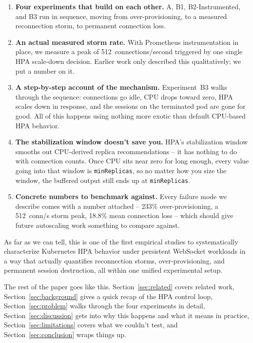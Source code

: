 \documentclass[twocolumn]{svjour3}
\begin{document}
\begin{enumerate}[leftmargin=*]
\item \textbf{Four experiments that build on each other.} A, B1, B2-Instrumented,
  and B3 run in sequence, moving from over-provisioning, to a measured reconnection
  storm, to permanent connection loss.

\item \textbf{An actual measured storm rate.} With Prometheus instrumentation in
  place, we measure a peak of 512~connections/second triggered by one single HPA
  scale-down decision. Earlier work only described this qualitatively; we put a
  number on it.

\item \textbf{A step-by-step account of the mechanism.} Experiment~B3 walks
  through the sequence: connections go idle, CPU drops toward zero, HPA scales
  down in response, and the sessions on the terminated pod are gone for good. All of
  this happens using nothing more exotic than default CPU-based HPA behavior.

\item \textbf{The stabilization window doesn't save you.} HPA's stabilization
  window smooths out CPU-derived replica recommendations -- it has nothing to do
  with connection counts. Once CPU sits near zero for long enough, every value
  going into that window is \texttt{minReplicas}, so no matter how you size the
  window, the buffered output still ends up at \texttt{minReplicas}.

\item \textbf{Concrete numbers to benchmark against.} Every failure mode we
  describe comes with a number attached -- 233\% over-provisioning, a 512~conn/s
  storm peak, 18.8\% mean connection loss -- which should give future autoscaling
  work something to compare against.
\end{enumerate}

As far as we can tell, this is one of the first empirical studies to systematically
characterize Kubernetes HPA behavior under persistent WebSocket workloads in a way
that actually quantifies reconnection storms, over-provisioning, and permanent
session destruction, all within one unified experimental setup.

The rest of the paper goes like this. Section~\ref{sec:related} covers related
work, Section~\ref{sec:background} gives a quick recap of the HPA control loop,
Section~\ref{sec:problem} walks through the four experiments in detail,
Section~\ref{sec:discussion} gets into why this happens and what it means in
practice, Section~\ref{sec:limitations} covers what we couldn't test, and
Section~\ref{sec:conclusion} wraps things up.
\end{document}

